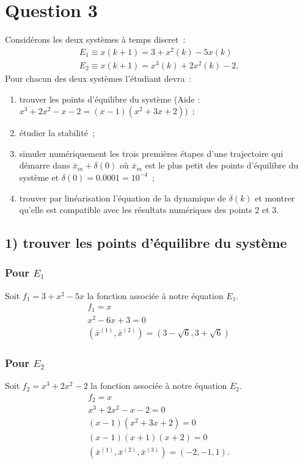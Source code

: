 \documentclass[11pt,a4paper]{report}
\begin{document}
	\pagebreak
	\section*{Question 3}
		Considérons les deux systèmes à temps discret~:
			\begin{gather*}
				E_1 \equiv x(k+1) = 3 + x^2(k) -5x(k)\\
				E_2 \equiv x(k+1) = x^3(k) + 2x^2(k)-2.
			\end{gather*}
		Pour chacun des deux systèmes l'étudiant devra~:
		\begin{enumerate}
			\item trouver les points d'équilibre du système (Aide : $x^3 + 2x^2 - x - 2 = (x-1)(x^2+3x+2)$)~;
			\item étudier la stabilité~;
			\item simuler numériquement les trois premières étapes d'une trajectoire qui démarre dans $\bar{x}_m + \delta(0)$ où $\bar{x}_m$ est le plus petit des points d'équilibre du système et $\delta(0) = 0.0001 = 10^{-4}$~;
			\item trouver par linéarisation l'équation de la dynamique de $\delta(k)$ et montrer qu'elle est compatible avec les résultats numériques des points 2 et 3.
		\end{enumerate}

		\subsection*{1) trouver les points d'équilibre du système}
			\subsubsection*{Pour $E_1$}
				Soit $f_1 = 3 + x^2 -5x$ la fonction associée à notre équation $E_1$.
				\begin{gather*}
					f_1 = x \\
					x^2 - 6x + 3 = 0 \\
					(\bar x^{(1)}, \bar x^{(2)}) = (3 - \sqrt 6, 3 + \sqrt 6)
				\end{gather*}

			\subsubsection*{Pour $E_2$}
				Soit $f_2 = x^3 + 2x^2 - 2$ la fonction associée à notre équation $E_2$.
				\begin{gather*}
					f_2 = x \\
					x^3 + 2x^2 - x - 2 = 0 \\
					(x-1)(x^2+3x+2) = 0 \\
					(x-1)(x+1)(x+2) = 0 \\
					(\bar x^{(1)}, \bar x^{(2)}, \bar x^{(3)}) = (-2, -1, 1).
				\end{gather*}
\end{document}
